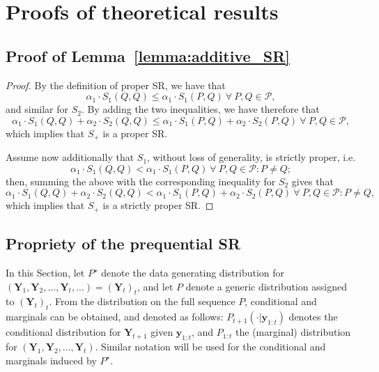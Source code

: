 \documentclass[twoside,11pt]{article}
\newcommand{\ddobs}{\mathbf{y}}
\newcommand{\Ddobs}{\mathbf{Y}}
\newcommand{\ddobsupt}{\mathbf{y}_{1:t}}
\begin{document}
	
	
	\FloatBarrier
	\appendix
	
	
	\section{Proofs of theoretical results}
	
	
	\subsection{Proof of Lemma~\ref{lemma:additive_SR}}\label{app:proof_lemma}
	
	\begin{proof}
		By the definition of proper SR, we have that
		$$ \alpha_1\cdot S_1(Q, Q) \le  \alpha_1\cdot  S_1(P,Q) \ \forall \ P,Q \in \mathcal{P},$$
		and similar for $ S_2 $. By adding the two inequalities, we have therefore that
		\begin{equation}\label{}
		\alpha_1\cdot S_1(Q, Q) + \alpha_2\cdot S_2(Q, Q) \le  \alpha_1\cdot  S_1(P,Q) +\alpha_2\cdot  S_2(P,Q) \ \forall \ P,Q \in \mathcal{P},
		\end{equation}
		which implies that $ S_+ $ is a proper SR. 
		
		Assume now additionally that $ S_1 $, without loss of generality, is strictly proper, i.e.
		$$ \alpha_1\cdot S_1(Q, Q) <  \alpha_1\cdot  S_1(P,Q) \ \forall \ P,Q \in \mathcal{P}: P\neq Q;$$
		then, summing the above with the corresponding inequality for $ S_2 $ gives that
		\begin{equation}\label{}
		\alpha_1\cdot S_1(Q, Q) + \alpha_2\cdot S_2(Q, Q) <  \alpha_1\cdot  S_1(P,Q) +\alpha_2\cdot  S_2(P,Q) \ \forall \ P,Q \in \mathcal{P}: P\neq Q,
		\end{equation}
		which implies that $ S_+ $ is a strictly proper SR.\end{proof}
	
	
	
	
	\subsection{Propriety of the prequential SR}\label{app:proof_preqSR}
	
	In this Section, let $ P^\star $ denote the data generating distribution for $ (\Ddobs_1, \Ddobs_2, \ldots, \Ddobs_t, \ldots) = (\Ddobs_t)_t $, and let $ P $ denote a generic distribution assigned to $ (\Ddobs_t)_t $. From the distribution on the full sequence $ P $, conditional and marginals can be obtained, and denoted as follows: $ P_{t+1}(\cdot|\ddobs_{1:t}) $ denotes the conditional distribution for $ \Ddobs_{t+1} $ given $ \ddobsupt $, and $ P_{1:t} $ the (marginal) distribution for $ (\Ddobs_1, \Ddobs_2, \ldots, \Ddobs_t) $. Similar notation will be used for the conditional and marginals induced by $ P^\star $.
	
\end{document}
